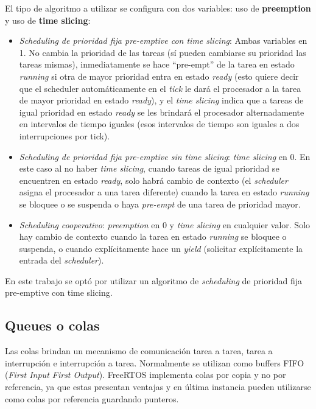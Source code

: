 \documentclass{IEEEtran}
\begin{document}
El tipo de algoritmo a utilizar se configura con dos variables: uso de \textbf{preemption} y uso de \textbf{time slicing}:

\begin{itemize}
    \item \textit{Scheduling de prioridad fija pre-emptive con time slicing}: Ambas variables en 1. No cambia la prioridad de las tareas (sí pueden cambiarse su prioridad las tareas mismas), inmediatamente se hace ``pre-empt'' de la tarea en estado \textit{running} si otra de mayor prioridad entra en estado \textit{ready} (esto quiere decir que el scheduler automáticamente en el \textit{tick} le dará el procesador a la tarea de mayor prioridad en estado \textit{ready}), y el \textit{time slicing} indica que a tareas de igual prioridad en estado \textit{ready} se les brindará el procesador alternadamente en intervalos de tiempo iguales (esos intervalos de tiempo son iguales a dos interrupciones por tick).
    \item \textit{Scheduling de prioridad fija pre-emptive sin time slicing}: \textit{time slicing} en 0. En este caso al no haber \textit{time slicing}, cuando tareas de igual prioridad se encuentren en estado \textit{ready}, solo habrá cambio de contexto (el \textit{scheduler} asigna el procesador a una tarea diferente) cuando la tarea en estado \textit{running} se bloquee o se suspenda o haya \textit{pre-empt} de una tarea de prioridad mayor.
    \item \textit{Scheduling cooperativo}: \textit{preemption} en 0 y \textit{time slicing} en cualquier valor. Solo hay cambio de contexto cuando la tarea en estado \textit{running} se bloquee o suspenda, o cuando explícitamente hace un \textit{yield} (solicitar explícitamente la entrada del \textit{scheduler}).
\end{itemize}

En este trabajo se optó por utilizar un algoritmo de \textit{scheduling} de prioridad fija pre-emptive con time slicing.

\subsection{Queues o colas}
Las colas brindan un mecanismo de comunicación tarea a tarea, tarea a interrupción e interrupción a tarea. Normalmente se utilizan como buffers FIFO (\textit{First Input First Output}). FreeRTOS implementa colas por copia y no por referencia, ya que estas presentan ventajas y en última instancia pueden utilizarse como colas por referencia guardando punteros.
\end{document}
